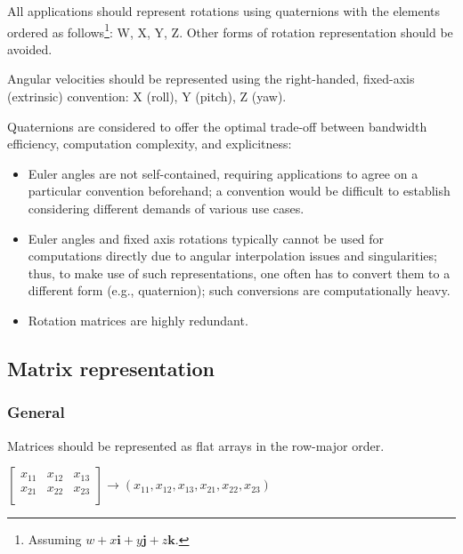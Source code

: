 All applications should represent rotations using quaternions with the elements ordered as follows\footnote{%
    Assuming $w + x\boldsymbol{i} + y\boldsymbol{j} + z\boldsymbol{k}$.
}: W, X, Y, Z.
Other forms of rotation representation should be avoided.

Angular velocities should be represented using the right-handed, fixed-axis (extrinsic) convention:
X (roll), Y (pitch), Z (yaw).

\begin{remark}
    Quaternions are considered to offer the optimal trade-off between bandwidth efficiency,
    computation complexity, and explicitness:
    \begin{itemize}
        \item Euler angles are not self-contained, requiring applications to agree on a particular
              convention beforehand; a convention would be difficult to establish considering different
              demands of various use cases.

        \item Euler angles and fixed axis rotations typically cannot be used for computations directly
              due to angular interpolation issues and singularities; thus, to make use of such
              representations, one often has to convert them to a different form (e.g., quaternion);
              such conversions are computationally heavy.

        \item Rotation matrices are highly redundant.
    \end{itemize}
\end{remark}

\subsection{Matrix representation}

\subsubsection{General}

Matrices should be represented as flat arrays in the row-major order.

\begin{remark}
    $
    \begin{bmatrix}
        x_{11} & x_{12} & x_{13} \\
        x_{21} & x_{22} & x_{23} \\
    \end{bmatrix} \rightarrow \left(x_{11}, x_{12}, x_{13}, x_{21}, x_{22}, x_{23}\right)
    $
\end{remark}

